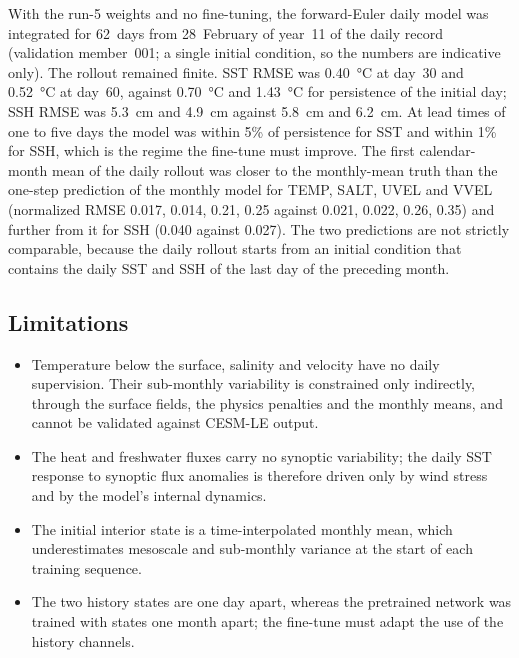 \documentclass[11pt]{article}
\begin{document}
With the run-5 weights and no fine-tuning, the forward-Euler daily model was
integrated for 62~days from 28~February of year~11 of the daily record
(validation member~001; a single initial condition, so the numbers are
indicative only). The rollout remained finite. SST RMSE was
\SI{0.40}{\celsius} at day~30 and \SI{0.52}{\celsius} at day~60, against
\SI{0.70}{\celsius} and \SI{1.43}{\celsius} for persistence of the initial
day; SSH RMSE was \SI{5.3}{\centi\metre} and \SI{4.9}{\centi\metre} against
\SI{5.8}{\centi\metre} and \SI{6.2}{\centi\metre}. At lead times of one to
five days the model was within 5\% of persistence for SST and within 1\% for
SSH, which is the regime the fine-tune must improve. The first calendar-month
mean of the daily rollout was closer to the monthly-mean truth than the
one-step prediction of the monthly model for TEMP, SALT, UVEL and VVEL
(normalized RMSE 0.017, 0.014, 0.21, 0.25 against 0.021, 0.022, 0.26, 0.35) and
further from it for SSH (0.040 against 0.027). The two predictions are not
strictly comparable, because the daily rollout starts from an initial condition
that contains the daily SST and SSH of the last day of the preceding month.

\subsection{Limitations}

\begin{itemize}[itemsep=2pt]
  \item Temperature below the surface, salinity and velocity have no daily
    supervision. Their sub-monthly variability is constrained only indirectly,
    through the surface fields, the physics penalties and the monthly means,
    and cannot be validated against CESM-LE output.
  \item The heat and freshwater fluxes carry no synoptic variability; the daily
    SST response to synoptic flux anomalies is therefore driven only by wind
    stress and by the model's internal dynamics.
  \item The initial interior state is a time-interpolated monthly mean, which
    underestimates mesoscale and sub-monthly variance at the start of each
    training sequence.
  \item The two history states are one day apart, whereas the pretrained network
    was trained with states one month apart; the fine-tune must adapt the use of
    the history channels.
\end{itemize}
\end{document}
